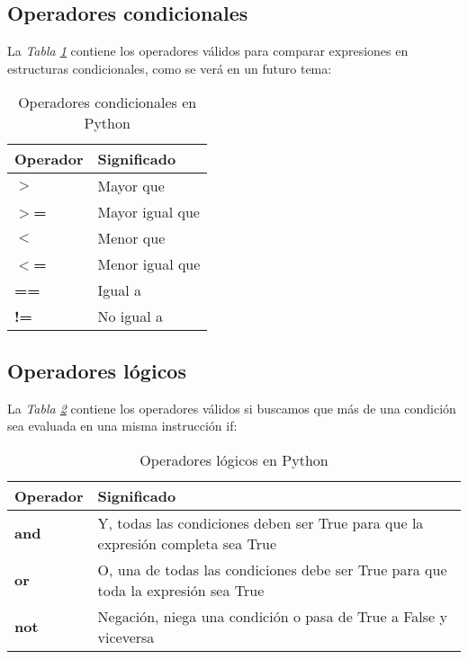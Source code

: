 \subsection{Operadores condicionales}
\hspace{0.55cm}La \textit{Tabla \ref{tab: 3}} contiene los operadores válidos para comparar expresiones en estructuras condicionales, como se verá en un futuro tema:
\begin{table}[H]
    \begin{center}
        \caption{Operadores condicionales en Python}
        \label{tab: 3}
        \begin{tabular}{m{3cm} m{3cm}}
            \hline
            \textbf{Operador} & \textbf{Significado} \\
            \hline
            \textbf{$>$}	& Mayor que \\
            \textbf{$>$=}	& Mayor igual que \\
            \textbf{$<$}	& Menor que \\
            \textbf{$<$=}	& Menor igual que \\
            \textbf{==}		& Igual a \\
            \textbf{!=}		& No igual a \\
            \hline
        \end{tabular}
    \end{center}
\end{table}


\subsection{Operadores lógicos}
\hspace{0.55cm}La \textit{Tabla \ref{tab: 4}} contiene los operadores válidos si buscamos que más de una condición sea evaluada en una misma instrucción if:
\begin{table}[H]
    \begin{center}
        \caption{Operadores lógicos en Python}
        \label{tab: 4}
        \begin{tabular}{m{3cm} m{10cm}}
            \hline
            \textbf{Operador} & \textbf{Significado} \\
            \hline
            \textbf{and	}	& Y, todas las condiciones deben ser True para que la expresión completa sea True \\
            \textbf{or}		& O, una de todas las condiciones debe ser True para que toda la expresión sea True \\
            \textbf{not}	& Negación, niega una condición o pasa de True a False y viceversa \\
            \hline
        \end{tabular}
    \end{center}
\end{table}


